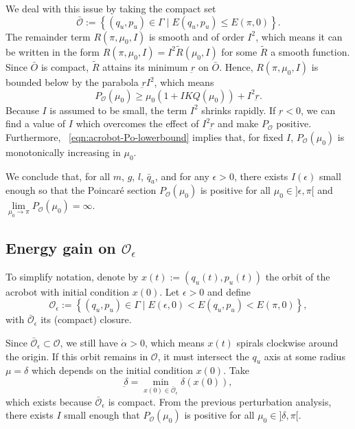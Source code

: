 We deal with this issue by taking the compact set
\[
    \bar{\mathcal{O}} := \left\{(q_u,p_u) \in \Gamma 
    \mid E(q_u,p_u) \leq E(\pi,0) \right\}
    .
\]
The remainder term \(R(\pi,\mu_0,I)\) is smooth and of order \(I^2\),
which means it can be written in the form 
\(R(\pi,\mu_0,I) = I^2\tilde{R}(\mu_0,I)\)
for some \(\tilde{R}\) a smooth function.
Since \(\bar{O}\) is compact, \(\tilde{R}\) attains its minimum
\(\underbar{r}\) on \(\bar{O}\).
Hence, \(R(\pi,\mu_0,I)\) is bounded below by the parabola
\(\underbar{r}I^2\), which means
\begin{equation}\label{eqn:acrobot-Po-lowerbound}
    P_\mathcal{O}(\mu_0) \geq \mu_0\left(1 + IKQ(\mu_0)\right) + I^2\underbar{r}
    .
\end{equation}
Because \(I\) is assumed to be small, the term \(I^2\) shrinks rapidly.
If \(\underbar{r} < 0\), we can find a value of \(I\) which overcomes
the effect of \(I^2\underbar{r}\) and make \(P_\mathcal{O}\) positive.
Furthermore, ~\eqref{eqn:acrobot-Po-lowerbound} implies that, for fixed \(I\),
\(P_\mathcal{O}(\mu_0)\) is monotonically increasing in \(\mu_0\).

We conclude that, for all \(m\), \(g\), \(l\), \(\bar{q}_a\), and for
any \(\epsilon > 0\), there exists \(I(\epsilon)\) small enough so that
the Poincar\'{e} section \(P_\mathcal{O}(\mu_0)\) is positive for all
\(\mu_0 \in ]\epsilon,\pi[\) and 
\(\lim \limits_{\mu_0 \to \pi} P_\mathcal{O}(\mu_0) = \infty\).

\subsection*{Energy gain on \(\mathcal{O}_\epsilon\)}
To simplify notation, denote by \(x(t) := (q_u(t),p_u(t))\) the orbit of the
acrobot with initial condition \(x(0)\).
Let \(\epsilon > 0\) and define
\[
    \mathcal{O}_\epsilon := \left\{(q_u,p_u) \in \Gamma
    \mid E(\epsilon,0) < E(q_u,p_u) < E(\pi,0)\right\}
    ,
\]
with \(\bar{\mathcal{O}}_\epsilon\) its (compact) closure.

Since \(\bar{\mathcal{O}}_\epsilon \subset \mathcal{O}\), we still have 
\(\dot{\alpha} > 0\), which means \(x(t)\) spirals clockwise around the origin.
If this orbit remains in \(\mathcal{O}\), it must intersect
the \(q_u\) axis at some radius \(\mu = \delta\)
which depends on the initial condition \(x(0)\).
Take 
\[
    \underbar{\delta} = 
    \min\limits_{x(0) \in \bar{\mathcal{O}}_\epsilon} \delta(x(0))
    ,
\] 
which exists because \(\bar{\mathcal{O}}_\epsilon\) is compact.
From the previous perturbation analysis,
there exists \(I\) small enough that \(P_\mathcal{O}(\mu_0)\) 
is positive for all \(\mu_0 \in ]\underbar{\delta},\pi[\).

